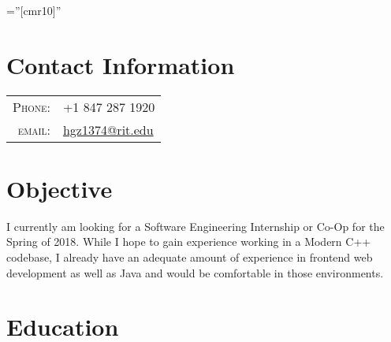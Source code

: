 \documentclass[a4paper,10pt]{article} %
\begin{document}
\pagestyle{empty} %

\font\fb=''[cmr10]'' %


\par{\bigskip\par} %

\section{Contact Information}

\begin{tabular}{rl}
\textsc{Phone:} & +1 847 287 1920\\
\textsc{email:} & \href{mailto:hgz1374@rit.edu}{hgz1374@rit.edu}
\end{tabular}

\section{Objective}
\small{
I currently am looking for a Software Engineering Internship or Co-Op for the Spring of 2018.
While I hope to gain experience working in a Modern C++ codebase, I already have an adequate amount of experience in frontend web development as well as Java and would be comfortable in those environments.
}


\section{Education}
\end{document}
